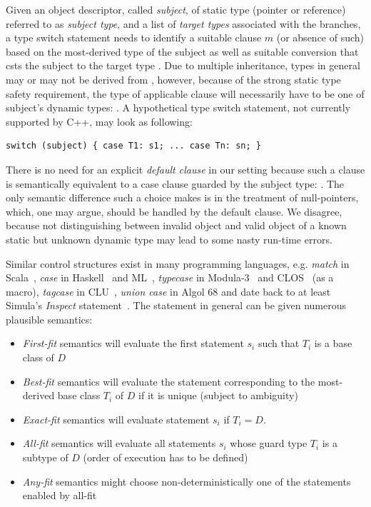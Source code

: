 Given an object descriptor, called \emph{subject}, of static type  
(pointer or reference) referred to as \emph{subject type}, and a list of 
\emph{target types}  associated with the branches, a type switch 
statement needs to identify a suitable clause $m$ (or absence of such) based on 
the most-derived type  of the subject as well as suitable 
conversion that csts the subject to the target type .  
Due to multiple inheritance, types  in general may or may not be 
derived from , however, because of the strong static type safety 
requirement, the type of applicable clause  will necessarily have to be 
one of subject's dynamic types: . A hypothetical type switch 
statement, not currently supported by C++, may look as following:

\begin{lstlisting}[keepspaces]
switch (subject) { case T1: s1; ... case Tn: sn; }
\end{lstlisting}

\noindent
There is no need for an explicit \emph{default clause} in our setting because 
such a clause is semantically equivalent to a case clause guarded by the 
subject type: . The only semantic difference such a choice 
makes is in the treatment of null-pointers, which, one may argue, should be 
handled by the default clause. We disagree, because not distinguishing between 
invalid object and valid object of a known static but unknown dynamic type may 
lead to some nasty run-time errors.

Similar control structures exist in many programming languages, e.g. 
\emph{match} in Scala~\cite{Scala2nd}, \emph{case} in Haskell~\cite{Haskell98Book} and 
ML~\cite{ML90}, \emph{typecase} in Modula-3~\cite{Modula3TS} and CLOS~\cite{??} (as a 
macro), \emph{tagcase} in CLU~\cite{CLURefMan}, \emph{union case} in Algol 68 
and date back to at least Simula's \emph{Inspect} statement~\cite{Simula67}. 
The statement in general can be given numerous plausible semantics:

\begin{itemize}
\setlength{\itemsep}{0pt}
\setlength{\parskip}{0pt}
\item \emph{First-fit} semantics will evaluate the first statement $s_i$ such 
      that $T_i$ is a base class of $D$
\item \emph{Best-fit} semantics will evaluate the statement corresponding to the 
      most-derived base class $T_i$ of $D$ if it is unique (subject to 
      ambiguity)
\item \emph{Exact-fit} semantics will evaluate statement $s_i$ if $T_i=D$.
\item \emph{All-fit} semantics will evaluate all statements $s_i$ whose guard 
      type $T_i$ is a subtype of $D$ (order of execution has to be defined)
\item \emph{Any-fit} semantics might choose non-deterministically one of the 
      statements enabled by all-fit
\end{itemize}

